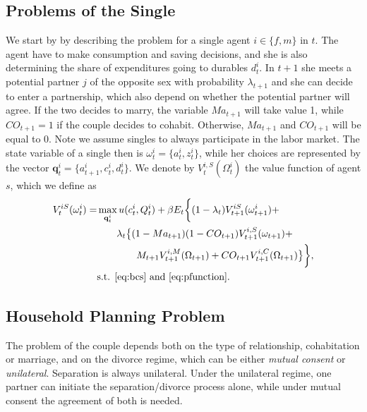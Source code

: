 \documentclass[12pt]{article}
\numberwithin{table}{section}
\begin{document}
\subsection{Problems of the Single}
We start by by describing the problem for a single agent $i\in\{f,m\}$ in $t$. The agent have to make consumption and saving decisions, and she is also determining the share of expenditures going to durables $d^i_t$. In $t+1$ she meets a potential partner $j$ of the opposite sex with probability $\lambda_{t+1}$ and she can decide to enter a partnership, which also depend on whether the potential partner will agree. If the two decides to marry, the variable $Ma_{t+1}$ will take value 1, while $CO_{t+1}=1$ if the couple decides to cohabit. Otherwise, $Ma_{t+1}$ and $CO_{t+1}$ will be equal to 0.  Note we assume singles to always participate in the labor market. The state variable of a single then is $\omega^i_t=\{a^i_t,z^i_t\}$, while her choices are represented by the vector $\mathbf{q}^i_t=\{a^i_{t+1},c^i_t,d^i_t\}$. We denote by $V_t^{i,S}(\Omega^i_t)$ the value function of agent $s$, which we define as
\begin{equation}\label{eq:v_single}
\begin{split}
V_t^{iS}(\omega^i_t)=&\max_{\mathbf{q}^i_t} u(c^i_t,Q^i_t)+\beta E_t \bigg\{(1-\lambda_t)V^{iS}_{t+1}(\omega^i_{t+1})+\\ & \quad\quad \lambda_t\big\{(1-Ma_{t+1})(1-CO_{t+1})	V^{i,S}_{t+1}(\omega_{t+1})+\\ &\quad\quad\quad\quad M_{t+1} V^{i,M}_{t+1}(\Omega_{t+1})+ CO_{t+1} V^{i,C}_{t+1}(\Omega_{t+1}) \big\}\bigg\},
\\ &\text{s.t. \eqref{eq:bcs} and \eqref{eq:pfunction}.} 
\end{split}
\end{equation}


\subsection{Household Planning Problem}
The problem of the couple depends both on the type of relationship, cohabitation or marriage, and on the divorce regime, which can be either \textit{mutual consent} or \textit{unilateral}. Separation is always unilateral. Under the unilateral regime, one partner can initiate the separation/divorce process alone, while under mutual consent the agreement of both is needed.
\end{document}
